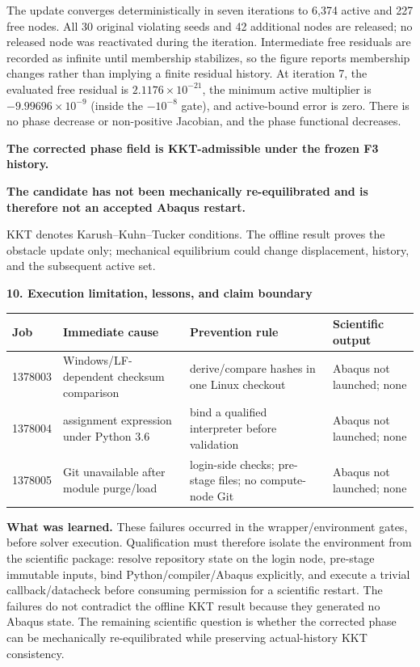 \documentclass[10pt,a4paper]{article}
\newcommand{\boxx}[2]{\colorbox{#1}{\parbox{\dimexpr\linewidth-2\fboxsep}{#2}}}
\newcommand{\headx}[1]{{\color{navy}\LARGE\bfseries #1}\par\vspace{1mm}{\color{blue}\rule{\linewidth}{1.1pt}}\vspace{2mm}}
\begin{document}
The update converges deterministically in seven iterations to 6,374 active and 227 free nodes. All 30 original violating seeds and 42 additional nodes are released; no released node was reactivated during the iteration. Intermediate free residuals are recorded as infinite until membership stabilizes, so the figure reports membership changes rather than implying a finite residual history. At iteration 7, the evaluated free residual is $2.1176\times10^{-21}$, the minimum active multiplier is $-9.99696\times10^{-9}$ (inside the $-10^{-8}$ gate), and active-bound error is zero. There is no phase decrease or non-positive Jacobian, and the phase functional decreases.

\boxx{pg}{\Large\bfseries The corrected phase field is KKT-admissible under the frozen F3 history.}
\boxx{pr}{\Large\bfseries The candidate has not been mechanically re-equilibrated and is therefore not an accepted Abaqus restart.}
\small KKT denotes Karush--Kuhn--Tucker conditions. The offline result proves the obstacle update only; mechanical equilibrium could change displacement, history, and the subsequent active set.

\clearpage
\headx{10. Execution limitation, lessons, and claim boundary}
\small
\begin{tabularx}{\linewidth}{@{}p{18mm}XXX@{}}\toprule
Job & Immediate cause & Prevention rule & Scientific output\\\midrule
1378003 & Windows/LF-dependent checksum comparison & derive/compare hashes in one Linux checkout & Abaqus not launched; none\\
1378004 & assignment expression under Python 3.6 & bind a qualified interpreter before validation & Abaqus not launched; none\\
1378005 & Git unavailable after module purge/load & login-side checks; pre-stage files; no compute-node Git & Abaqus not launched; none\\\bottomrule
\end{tabularx}
\normalsize
\textbf{What was learned.} These failures occurred in the wrapper/environment gates, before solver execution. Qualification must therefore isolate the environment from the scientific package: resolve repository state on the login node, pre-stage immutable inputs, bind Python/compiler/Abaqus explicitly, and execute a trivial callback/datacheck before consuming permission for a scientific restart. The failures do not contradict the offline KKT result because they generated no Abaqus state. The remaining scientific question is whether the corrected phase can be mechanically re-equilibrated while preserving actual-history KKT consistency.
\end{document}
